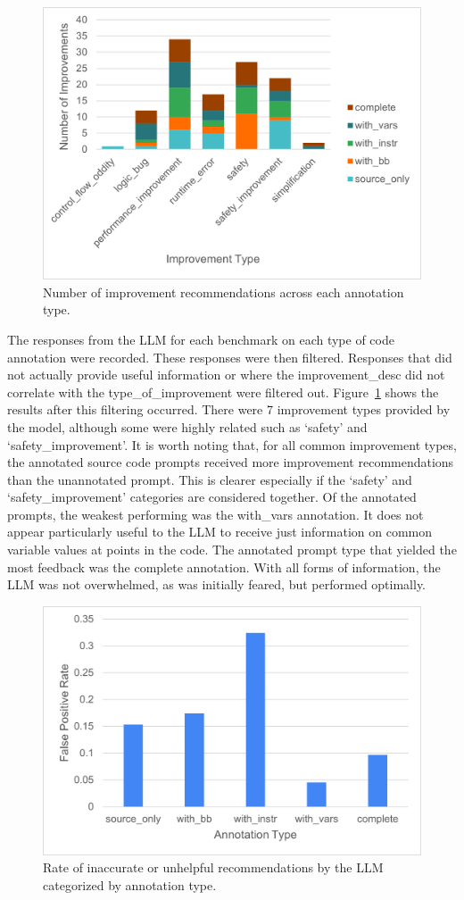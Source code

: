 \documentclass[sigconf]{acmart}
\begin{document}
\begin{figure}
    \centering
    \includegraphics[width=0.8\linewidth]{images/PostFiltering.png}
    \caption{Number of improvement recommendations across each annotation type.}
    \label{fig:filtered}
\end{figure}

The responses from the LLM for each benchmark on each type of code annotation were recorded.
These responses were then filtered.
Responses that did not actually provide useful information or where the improvement\_desc did not correlate with the type\_of\_improvement were filtered out.
Figure~\ref{fig:filtered} shows the results after this filtering occurred.
There were 7 improvement types provided by the model, although some were highly related such as `safety' and `safety\_improvement'.
It is worth noting that, for all common improvement types, the annotated source code prompts received more improvement recommendations than the unannotated prompt.
This is clearer especially if the `safety' and `safety\_improvement' categories are considered together.
Of the annotated prompts, the weakest performing was the with\_vars annotation.
It does not appear particularly useful to the LLM to receive just information on common variable values at points in the code.
The annotated prompt type that yielded the most feedback was the complete annotation.
With all forms of information, the LLM was not overwhelmed, as was initially feared, but performed optimally.

\begin{figure}
    \centering
    \includegraphics[width=0.8\linewidth]{images/FalsePositiveRate.png}
    \caption{Rate of inaccurate or unhelpful recommendations by the LLM categorized by annotation type.}
    \label{fig:falsePositive}
\end{figure}
\end{document}
